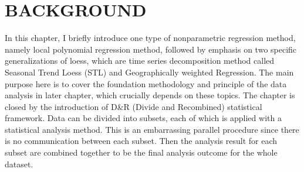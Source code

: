 \chapter{BACKGROUND}

In this chapter, I briefly introduce one type of nonparametric
regression method, namely local polynomial regression method, followed by emphasis 
on two specific generalizations of loess, which are time series decomposition 
method called Seasonal Trend Loess (STL) and Geographically weighted Regression. 
The main purpose here is to cover the foundation methodology and principle of the 
data analysis in later chapter, which crucially depends on these topics. The 
chapter is closed by the introduction of D\&R (Divide and Recombined)
statistical framework. Data can be divided into subsets, each of which is applied
with a statistical analysis method. This is an embarrassing parallel procedure
since there is no communication between each subset. Then the analysis result for
each subset are combined together to be the final analysis outcome for the whole
dataset.










